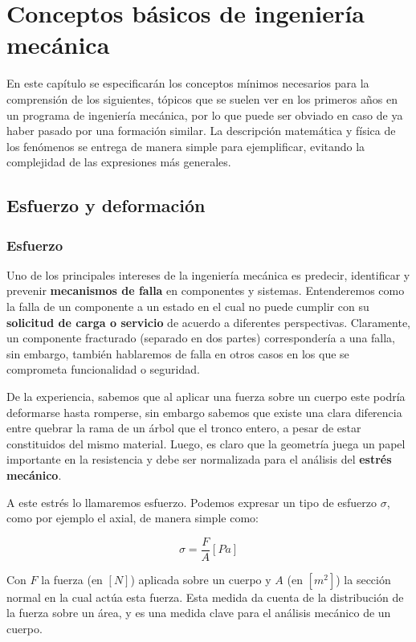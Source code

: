 \chapter{Conceptos básicos de ingeniería mecánica}

En este capítulo se especificarán los conceptos mínimos necesarios para la comprensión de los siguientes, tópicos que se suelen ver en los primeros años en un programa de ingeniería mecánica, por lo que puede ser obviado en caso de ya haber pasado por una formación similar. La descripción matemática y física de los fenómenos se entrega de manera simple para ejemplificar, evitando la complejidad de las expresiones más generales.

\section{Esfuerzo y deformación}

\subsection{Esfuerzo}

Uno de los principales intereses de la ingeniería mecánica es predecir, identificar y prevenir \textbf{mecanismos de falla} en componentes y sistemas. Entenderemos como la falla de un componente a un estado en el cual no puede cumplir con su \textbf{solicitud de carga o servicio} de acuerdo a diferentes perspectivas. Claramente, un componente fracturado (separado en dos partes) correspondería a una falla, sin embargo, también hablaremos de falla en otros casos en los que se comprometa funcionalidad o seguridad.

De la experiencia, sabemos que al aplicar una fuerza sobre un cuerpo este podría deformarse hasta romperse, sin embargo sabemos que existe una clara diferencia entre quebrar la rama de un árbol que el tronco entero, a pesar de estar constituidos del mismo material. Luego, es claro que la geometría juega un papel importante en la resistencia y debe ser normalizada para el análisis del \textbf{estrés mecánico}.

A este estrés lo llamaremos esfuerzo. Podemos expresar un tipo de esfuerzo $\sigma$, como por ejemplo el axial, de manera simple como:

\begin{equation}
    \sigma = \frac{F}{A}[Pa]
    \label{eq1}
\end{equation}

Con $F$ la fuerza (en $[N]$) aplicada sobre un cuerpo y $A$ (en $[m^{2}]$) la sección normal en la cual actúa esta fuerza. Esta medida da cuenta de la distribución de la fuerza sobre un área, y es una medida clave para el análisis mecánico de un cuerpo. 

